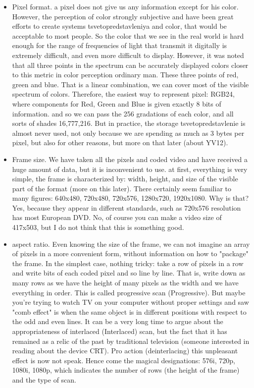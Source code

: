 \begin{itemize}
\item Pixel format. a pixel does not give us any information except for his color. However, the perception of color strongly subjective and have been great efforts to create systems tsvetopredstavleniya and color, that would be acceptable to most people. So the color that we see in the real world is hard enough for the range of frequencies of light that transmit it digitally is extremely difficult, and even more difficult to display. However, it was noted that all three points in the spectrum can be accurately displayed colors closer to this metric in color perception ordinary man. These three points of red, green and blue. That is a linear combination, we can cover most of the visible spectrum of colors. Therefore, the easiest way to represent pixel: RGB24, where components for Red, Green and Blue is given exactly 8 bits of information. and so we can pass the 256 gradations of each color, and all sorts of shades 16,777,216. But in practice, the storage tsvetopredstavlenie is almost never used, not only because we are spending as much as 3 bytes per pixel, but also for other reasons, but more on that later (about YV12).
\item Frame size. We have taken all the pixels and coded video and have received a huge amount of data, but it is inconvenient to use. at first, everything is very simple, the frame is characterized by: width, height, and size of the visible part of the format (more on this later). There certainly seem familiar to many figures: 640x480, 720x480, 720x576, 1280x720, 1920x1080. Why is that? Yes, because they appear in different standards, such as 720x576 resolution has most European DVD. No, of course you can make a video size of 417x503, but I do not think that this is something good.
\item aspect ratio. Even knowing the size of the frame, we can not imagine an array of pixels in a more convenient form, without information on how to "package" the frame. In the simplest case, nothing tricky: take a row of pixels in a row and write bits of each coded pixel and so line by line. That is, write down as many rows as we have the height of many pixels as the width and we have everything in order. This is called progressive scan (Progressive). But maybe you're trying to watch TV on your computer without proper settings and saw "comb effect" is when the same object is in different positions with respect to the odd and even lines. It can be a very long time to argue about the appropriateness of interlaced (Interlaced) scan, but the fact that it has remained as a relic of the past by traditional television (someone interested in reading about the device CRT). Pro action (deinterlacing) this unpleasant effect is now not speak. Hence come the magical designations: 576i, 720p, 1080i, 1080p, which indicates the number of rows (the height of the frame) and the type of scan.

\end{itemize}
